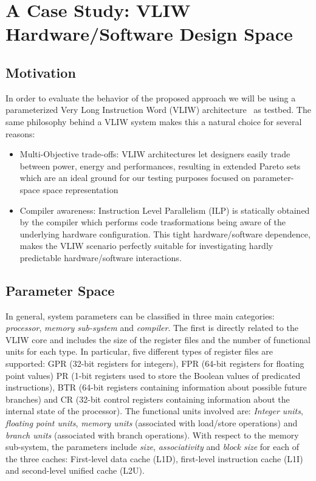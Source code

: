 \section{A Case Study: VLIW Hardware/Software Design Space}
\label{sec:ee}
\subsection{Motivation}
In order to evaluate the behavior of the proposed approach
we will be using a parameterized Very Long Instruction
Word (VLIW) architecture~\cite{kathail_tr00} as testbed. The same philosophy
behind a VLIW system makes this a natural choice for several reasons:
\begin{itemize}
\item{Multi-Objective trade-offs}: VLIW architectures let designers
easily trade between power, energy and performances, resulting
in extended Pareto sets which are an ideal ground for our testing
purposes focused on parameter-space space representation
\item{Compiler awareness}: Instruction Level Parallelism (ILP)
is statically obtained by the compiler which
performs code trasformations being aware of the underlying hardware
configuration.  This tight hardware/software dependence, makes the
VLIW scenario perfectly suitable for investigating hardly predictable
hardware/software interactions.
\end{itemize}

\subsection{Parameter Space}
In general, system parameters can be classified in three main categories:
\emph{processor}, \emph{memory sub-system} and \emph{compiler}. 
The first is directly related to the VLIW core and includes the size
of the register files and the number of functional
units for each type. In particular, five different types of register
files are supported:
GPR (32-bit registers for integers), FPR (64-bit registers for
floating point values) PR (1-bit registers used to store the Boolean
values of predicated instructions), BTR (64-bit registers containing
information about possible future branches) and CR (32-bit control
registers containing information about the internal state of the
processor). The functional units involved are: \emph{Integer units},
\emph{floating point units}, \emph{memory units} (associated with
load/store operations) and \emph{branch units} (associated with branch
operations). With respect to the memory sub-system, the parameters
include \emph{size}, \emph{associativity} and
\emph{block size} for each of the three caches: First-level data cache
(L1D), first-level instruction cache (L1I) and second-level unified
cache (L2U).

